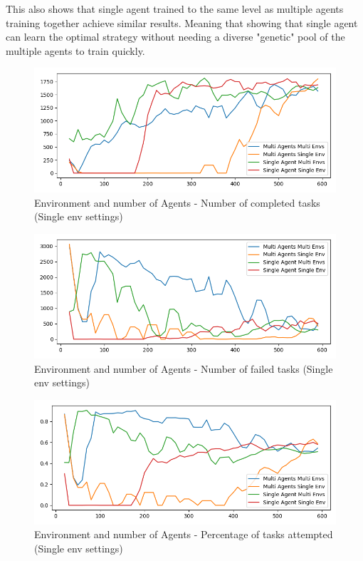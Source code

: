 This also shows that single agent trained to the same level as multiple agents training together achieve similar
results. Meaning that showing that single agent can learn the optimal strategy without needing a  diverse "genetic"
pool of the multiple agents to train quickly.

\begin{figure}[H]
    \centering
    \includegraphics[width=\linewidth]{figures/5_evaluation_figs/env_agent_num_training_fig/single_env_num_completed_tasks.png}
    \caption{Environment and number of Agents - Number of completed tasks (Single env settings)}
    \label{fig:single-env-num-completed-tasks}
\end{figure}

\begin{figure}[H]
    \centering
    \includegraphics[width=\linewidth]{figures/5_evaluation_figs/env_agent_num_training_fig/single_env_num_failed_tasks.png}
    \caption{Environment and number of Agents - Number of failed tasks (Single env settings)}
    \label{fig:single-env-num-failed-tasks}
\end{figure}

\begin{figure}[H]
    \centering
    \includegraphics[width=\linewidth]{figures/5_evaluation_figs/env_agent_num_training_fig/single_env_percent_tasks.png}
    \caption{Environment and number of Agents - Percentage of tasks attempted (Single env settings)}
    \label{fig:single-env-percent-tasks}
\end{figure}

